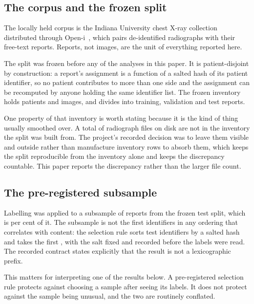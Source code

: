 
\subsection{The corpus and the frozen split}

The locally held corpus is the Indiana University chest X-ray collection
distributed through Open-i~\cite{demnerfushman2016preparing}, which pairs
de-identified radiographs with their free-text reports. Reports, not images, are
the unit of everything reported here.

The split was frozen before any of the analyses in this paper. It is
patient-disjoint by construction: a report's assignment is a function of a
salted hash of its patient identifier, so no patient contributes to more than one
side and the assignment can be recomputed by anyone holding the same identifier
list. The frozen inventory holds \NPatients{} patients and \NImages{} images,
and divides into \NTrain{} training, \NVal{} validation and \NTest{} test
reports.

One property of that inventory is worth stating because it is the kind of thing
usually smoothed over. A total of \NOutsideInventory{} radiograph files on disk
are not in
the inventory the split was built from. The project's recorded decision was to
leave them visible and outside rather than manufacture inventory rows to absorb
them, which keeps the split reproducible from the inventory alone and keeps the
discrepancy countable. This paper reports the discrepancy rather than the larger
file count.

\subsection{The pre-registered subsample}

Labelling was applied to a subsample of \NCohort{} reports from the frozen test
split, which is \CoveragePct{} per cent of it. The subsample is not the first
\NCohort{} identifiers in any ordering that correlates with content: the
selection rule sorts test identifiers by a salted hash and takes the first
\NCohort{}, with the salt fixed and recorded before the labels were read. The
recorded contract states explicitly that the result is not a lexicographic
prefix.

This matters for interpreting one of the results below. A pre-registered
selection rule protects against choosing a sample after seeing its labels. It
does not protect against the sample being unusual, and the two are routinely
conflated.

